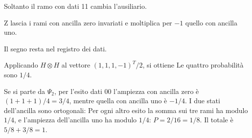 
Soltanto il ramo con dati 11 cambia l’ausiliario.


Z lascia i rami con ancilla zero invariati e moltiplica per \(-1\) quello con ancilla uno.


Il segno resta nel registro dei dati.


Applicando \(H\otimes H\) al vettore \((1,1,1,-1)^T/2\), si ottiene
Le quattro probabilità sono \(1/4\).


Se si parte da \(\Psi_2\), per l’esito dati 00 l’ampiezza con ancilla zero è \((1+1+1)/4=3/4\), mentre quella con ancilla uno è \(-1/4\). I due stati dell’ancilla sono ortogonali:
Per ogni altro esito la somma sui tre rami ha modulo \(1/4\), e l’ampiezza dell’ancilla uno ha modulo \(1/4\): \(P=2/16=1/8\). Il totale è \(5/8+3/8=1\).

